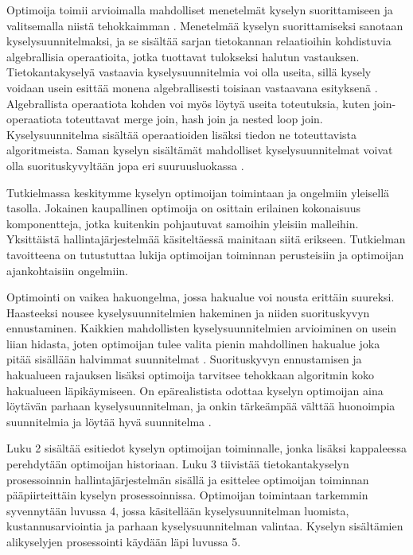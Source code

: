 \documentclass[finnish]{tktltiki2}
\theoremstyle{definition}
\theoremstyle{remark}
\begin{document}
Optimoija toimii arvioimalla mahdolliset menetelmät kyselyn suorittamiseen ja valitsemalla niistä tehokkaimman \cite{selinger1979access}. Menetelmää kyselyn suorittamiseksi sanotaan kyselysuunnitelmaksi, ja se sisältää sarjan tietokannan relaatioihin kohdistuvia algebrallisia operaatioita, jotka tuottavat tulokseksi halutun vastauksen. Tietokantakyselyä vastaavia kyselysuunnitelmia voi olla useita, sillä kysely voidaan usein esittää monena algebrallisesti toisiaan vastaavana esityksenä \cite{jarke1984}. Algebrallista operaatiota kohden voi myös löytyä useita toteutuksia, kuten join-operaatiota toteuttavat merge join, hash join ja nested loop join. Kyselysuunnitelma sisältää operaatioiden lisäksi tiedon ne toteuttavista algoritmeista. Saman kyselyn sisältämät mahdolliset kyselysuunnitelmat voivat olla suorituskyvyltään jopa eri suuruusluokassa \cite{ioannidis1996query, oracle2013refman}. 


Tutkielmassa keskitymme kyselyn optimoijan toimintaan ja ongelmiin yleisellä tasolla. Jokainen kaupallinen optimoija on osittain erilainen kokonaisuus komponentteja, jotka kuitenkin pohjautuvat samoihin yleisiin malleihin. Yksittäistä hallintajärjestelmää käsiteltäessä mainitaan siitä erikseen. Tutkielman tavoitteena on tutustuttaa lukija optimoijan toiminnan perusteisiin ja optimoijan ajankohtaisiin ongelmiin.

Optimointi on vaikea hakuongelma, jossa hakualue voi nousta erittäin suureksi. Haasteeksi nousee kyselysuunnitelmien hakeminen ja niiden suorituskyvyn ennustaminen. Kaikkien mahdollisten kyselysuunnitelmien arvioiminen on usein liian hidasta, joten optimoijan tulee valita pienin mahdollinen hakualue joka pitää sisällään halvimmat suunnitelmat \cite{chaudhuri1998}. Suorituskyvyn ennustamisen ja hakualueen rajauksen lisäksi optimoija tarvitsee tehokkaan algoritmin koko hakualueen läpikäymiseen. On epärealistista odottaa kyselyn optimoijan aina löytävän parhaan kyselysuunnitelman, ja onkin tärkeämpää välttää huonoimpia suunnitelmia ja löytää hyvä suunnitelma \cite{ramakrishnan2003database}. 

Luku 2 sisältää esitiedot kyselyn optimoijan toiminnalle, jonka lisäksi kappaleessa perehdytään optimoijan historiaan. Luku 3 tiivistää tietokantakyselyn prosessoinnin hallintajärjestelmän sisällä ja esittelee optimoijan toiminnan pääpiirteittäin kyselyn prosessoinnissa. Optimoijan toimintaan tarkemmin syvennytään luvussa 4, jossa käsitellään kyselysuunnitelman luomista, kustannusarviointia ja parhaan kyselysuunnitelman valintaa. Kyselyn sisältämien alikyselyjen prosessointi käydään läpi luvussa 5.
\end{document}
